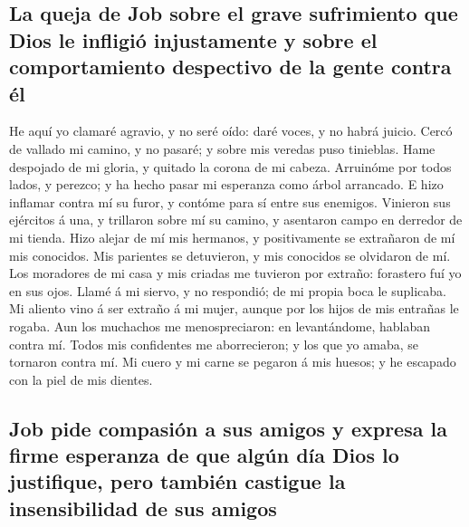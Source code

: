 \hypertarget{la-queja-de-job-sobre-el-grave-sufrimiento-que-dios-le-infligiuxf3-injustamente-y-sobre-el-comportamiento-despectivo-de-la-gente-contra-uxe9l}{%
\subsection{La queja de Job sobre el grave sufrimiento que Dios le
infligió injustamente y sobre el comportamiento despectivo de la gente
contra
él}\label{la-queja-de-job-sobre-el-grave-sufrimiento-que-dios-le-infligiuxf3-injustamente-y-sobre-el-comportamiento-despectivo-de-la-gente-contra-uxe9l}}

 He aquí yo clamaré agravio, y no seré oído: daré voces, y
no habrá juicio.  Cercó de vallado mi camino, y no pasaré; y
sobre mis veredas puso tinieblas.  Hame despojado de mi
gloria, y quitado la corona de mi cabeza.  Arruinóme por
todos lados, y perezco; y ha hecho pasar mi esperanza como árbol
arrancado.  E hizo inflamar contra mí su furor, y contóme
para sí entre sus enemigos.  Vinieron sus ejércitos á una,
y trillaron sobre mí su camino, y asentaron campo en derredor de mi
tienda.  Hizo alejar de mí mis hermanos, y positivamente se
extrañaron de mí mis conocidos.  Mis parientes se
detuvieron, y mis conocidos se olvidaron de mí.  Los
moradores de mi casa y mis criadas me tuvieron por extraño: forastero
fuí yo en sus ojos.  Llamé á mi siervo, y no respondió; de
mi propia boca le suplicaba.  Mi aliento vino á ser extraño
á mi mujer, aunque por los hijos de mis entrañas le rogaba.
 Aun los muchachos me menospreciaron: en levantándome,
hablaban contra mí.  Todos mis confidentes me aborrecieron;
y los que yo amaba, se tornaron contra mí.  Mi cuero y mi
carne se pegaron á mis huesos; y he escapado con la piel de mis dientes.

\hypertarget{job-pide-compasiuxf3n-a-sus-amigos-y-expresa-la-firme-esperanza-de-que-alguxfan-duxeda-dios-lo-justifique-pero-tambiuxe9n-castigue-la-insensibilidad-de-sus-amigos}{%
\subsection{Job pide compasión a sus amigos y expresa la firme esperanza
de que algún día Dios lo justifique, pero también castigue la
insensibilidad de sus
amigos}\label{job-pide-compasiuxf3n-a-sus-amigos-y-expresa-la-firme-esperanza-de-que-alguxfan-duxeda-dios-lo-justifique-pero-tambiuxe9n-castigue-la-insensibilidad-de-sus-amigos}}

